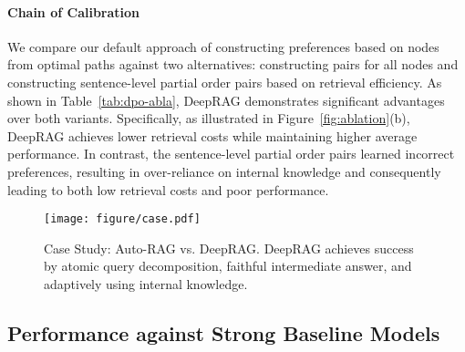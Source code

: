 

\paragraph{Chain of Calibration} We compare our default approach of constructing preferences based on nodes from optimal paths against two alternatives: constructing pairs for all nodes and constructing sentence-level partial order pairs based on retrieval efficiency.
% 
As shown in Table~\ref{tab:dpo-abla}, DeepRAG demonstrates significant advantages over both variants. Specifically, as illustrated in Figure~\ref{fig:ablation}(b), DeepRAG achieves lower retrieval costs while maintaining higher average performance. In contrast, the sentence-level partial order pairs learned incorrect preferences, resulting in over-reliance on internal knowledge and consequently leading to both low retrieval costs and poor performance.


\begin{figure*}[htbp]
    \centering
    \texttt{[image: figure/case.pdf]}
    \caption{Case Study: Auto-RAG vs. DeepRAG. DeepRAG achieves success by atomic query decomposition, faithful intermediate answer, and adaptively using internal knowledge.}
    \label{fig:case-study}
\end{figure*}

\subsection{Performance against Strong Baseline Models}


